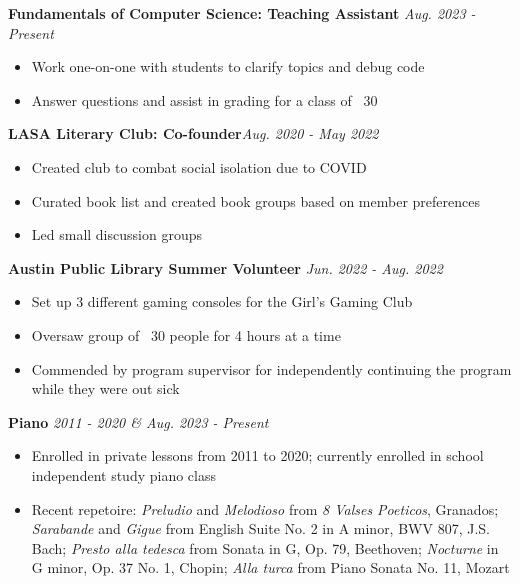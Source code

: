 \documentclass{article}
\begin{document}
\begin{flushleft}
    \newpage
    \textbf{Fundamentals of Computer Science: Teaching Assistant} \hfill \textsl{Aug. 2023 - Present}
    \begin{itemize}
        \setlength\itemsep{-.2em}
        \item Work one-on-one with students to clarify topics and debug code
        \item Answer questions and assist in grading for a class of ~30
    \end{itemize}

    \textbf{LASA Literary Club: Co-founder}\hfill \textsl{Aug. 2020 - May 2022}
    \begin{itemize}
        \setlength\itemsep{-.2em}
        \item Created club to combat social isolation due to COVID
        \item Curated book list and created book groups based on member preferences
        \item Led small discussion groups
    \end{itemize}

    \textbf{Austin Public Library Summer Volunteer} \hfill \textsl{Jun. 2022 - Aug. 2022}
    \begin{itemize}
        \setlength\itemsep{-.2em}
        \item Set up 3 different gaming consoles for the Girl’s Gaming Club
        \item Oversaw group of ~30 people for 4 hours at a time
        \item Commended by program supervisor for independently continuing the program while they were out sick
    \end{itemize}

    \textbf{Piano} \hfill \textsl{2011 - 2020 \& Aug. 2023 - Present}
    \begin{itemize}
        \setlength\itemsep{-.2em}
        \item Enrolled in private lessons from 2011 to 2020; currently enrolled in school independent study piano class
        \item Recent repetoire: \textit{Preludio} and \textit{Melodioso} from \textit{8 Valses Poeticos}, Granados; \textit{Sarabande} and \textit{Gigue} from English Suite No. 2 in A minor, BWV 807, J.S. Bach; \textit{Presto alla tedesca} from Sonata in G, Op. 79, Beethoven; \textit{Nocturne} in G minor, Op. 37 No. 1, Chopin; \textit{Alla turca} from Piano Sonata No. 11, Mozart
    \end{itemize}


\end{flushleft}
\end{document}
